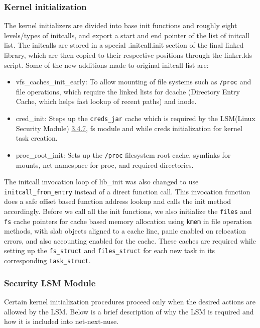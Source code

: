 \documentclass{sig-alternate}
\begin{document}
\subsubsection{Kernel initialization}
The kernel initializers are divided into base init functions and roughly eight levels/types of initcalls, and export a start and end pointer of the list of initcall list. 
The initcalls are stored in a special .initcall.init section of the final linked library, which are then copied to their respective positions through the linker.lds script.
Some of the new additions made to original initcall list are: 

\begin{itemize}
  \item vfs\_caches\_init\_early: To allow mounting of file systems such as \texttt{/proc} and file operations, which require the linked lists for 
  dcache (Directory Entry Cache, which helps fast lookup of recent paths) and inode.
  \item cred\_init: Steps up the \texttt{creds\_jar} cache which is required by the LSM(Linux Security Module) \hyperref[Section_LSM]{3.4.7}, fs module and 
  while creds initialization for kernel task creation.
  \item proc\_root\_init: Sets up the \texttt{/proc} filesystem root cache, symlinks for mounts, net namespace for proc, and required directories.
\end{itemize}

The initcall invocation loop of lib\_init was also changed to use \texttt{initcall\_from\_entry} instead of a direct function call. 
This invocation function does a safe offset based function address lookup and calls the init method accordingly. 
Before we call all the init functions, we also initialize the \texttt{files} and \texttt{fs} cache pointers for cache based memory 
allocation using \texttt{kmem} in file operation methods, with slab objects aligned to a cache line, panic enabled on relocation errors, and also accounting enabled 
for the cache. These caches are required while setting up the \texttt{fs\_struct} and \texttt{files\_struct} for each new task in its 
corresponding \texttt{task\_struct}. 

\subsubsection{Security LSM Module}\label{Section_LSM}
Certain kernel initialization procedures proceed only when the desired actions are allowed by the LSM. Below is a brief description of why the LSM is required and how 
it is included into net-next-nuse.
\end{document}
